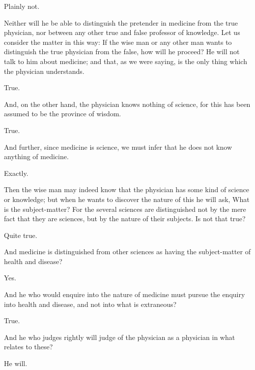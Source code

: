\documentclass[11pt,letter]{article}
\begin{document}
\par  Plainly not.

\par  Neither will he be able to distinguish the pretender in medicine from the true physician, nor between any other true and false professor of knowledge. Let us consider the matter in this way: If the wise man or any other man wants to distinguish the true physician from the false, how will he proceed? He will not talk to him about medicine; and that, as we were saying, is the only thing which the physician understands.

\par  True.

\par  And, on the other hand, the physician knows nothing of science, for this has been assumed to be the province of wisdom.

\par  True.

\par  And further, since medicine is science, we must infer that he does not know anything of medicine.

\par  Exactly.

\par  Then the wise man may indeed know that the physician has some kind of science or knowledge; but when he wants to discover the nature of this he will ask, What is the subject-matter? For the several sciences are distinguished not by the mere fact that they are sciences, but by the nature of their subjects. Is not that true?

\par  Quite true.

\par  And medicine is distinguished from other sciences as having the subject-matter of health and disease?

\par  Yes.

\par  And he who would enquire into the nature of medicine must pursue the enquiry into health and disease, and not into what is extraneous?

\par  True.

\par  And he who judges rightly will judge of the physician as a physician in what relates to these?

\par  He will.
\end{document}

